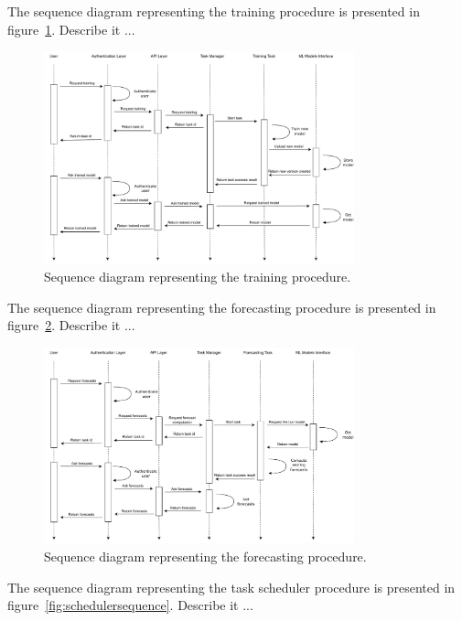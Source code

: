 The sequence diagram representing the training procedure is presented in figure~\ref{fig:trainingsequence}.
Describe it ...

\begin{figure}[H]
\centering 
\includegraphics[width=0.8\textwidth]{images/architecture_training_sequence}
\caption{Sequence diagram representing the training procedure.}
\label{fig:trainingsequence}
\end{figure}

The sequence diagram representing the forecasting procedure is presented in figure~\ref{fig:forecastingsequence}.
Describe it ...

\begin{figure}[H]
\centering 
\includegraphics[width=0.8\textwidth]{images/architecture_forecasting_sequence}
\caption{Sequence diagram representing the forecasting procedure.}
\label{fig:forecastingsequence}
\end{figure}

The sequence diagram representing the task scheduler procedure is presented in figure~\ref{fig:schedulersequence}.
Describe it ...

